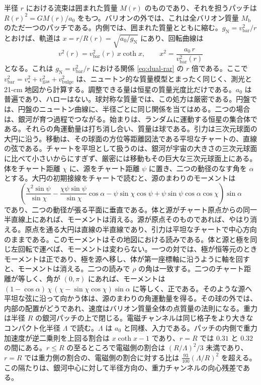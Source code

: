\documentclass[a4paper]{article}
\begin{document}
半径 $r$ における流束は囲まれた質量 $M(r)$ のものであり、それを担うパッチは $R(r)^2=GM(r)/a_0$ をもつ。バリオンの外では、これは全バリオン質量 $M_{\text{b}}$ のただ一つのパッチである。内側では、囲まれた質量とともに縮む。$g_{\text{N}}=v_{\text{bar}}^2/r$ とおけば、軌道は $x=r/R(r)=\sqrt{a_0/g_{\text{N}}}$ にあり、回転曲線は
\begin{equation}
\label{eq:dual-rotation}
v^2(r)=v_{\text{bar}}^2(r)\,x\coth x, \qquad x^2=\frac{a_0\,r}{v_{\text{bar}}^2(r)}
\end{equation}
となる。これは $g_{\text{N}}=v_{\text{bar}}^2/r$ における関係 \eqref{eq:dual-rar} の $r$ 倍である。ここで $v_{\text{bar}}^2=v_\star^2+v_{\text{gas}}^2+v_{\text{bulge}}^2$ は、ニュートン的な質量模型とまったく同じく、測光と 21-cm 地図から計算する。調整できる量は恒星の質量光度比だけである。$a_0$ は普遍であり、ハローはない。球対称な質量では、この処方は厳密である。円盤では、円盤のニュートン曲線に、半径ごとに同じ関係を当てはめる。二つの場合は、銀河が育つ過程でつながる。始まりは、ランダムに運動する恒星の集合体である。それらの角運動量は打ち消し合い、質量は球である。引力は三次元球面の大円に沿う。移動は、その球面の方位等距離図法である平坦なチャートの、直線の弦である。チャートを平坦として扱うのは、銀河が宇宙の大きさの三次元球面に比べて小さいからにすぎず、厳密には移動もその巨大な三次元球面上にある。体をチャート距離 $\chi$ に、源をチャート距離 $\psi$ に置き、二つの動径のなす角を $\alpha$ とする。大円の初期接線をチャートで読むと、源のまわりのモーメントは
\begin{equation}
\label{eq:sphere-chord}
\left(\frac{\chi^{2}\sin\psi}{\sin\chi}-\frac{\chi\psi\sin\psi}{\sin\chi}\cos\alpha-\psi\sin\chi\cos\psi+\psi\sin\psi\cos\alpha\cos\chi\right)\sin\alpha
\end{equation}
であり、二つの動径が張る平面に垂直である。体と源がチャート原点からの同一半直線上にあれば、モーメントは消える。源が原点そのものであれば、やはり消える。原点を通る大円は直線の半直線であり、引力は平坦なチャートで中心方向のままである。このモーメントはその地図における読みである。体と源と極を同じ左回転で運べば、モーメントは変わらない。一つの対では、極が恒等元のときモーメントは正であり、極を源へ移し、体が第一座標軸に沿うように軸を回すと、モーメントは消える。二つの読みで $\rho$ の角は一致する。二つのチャート距離が等しく、角が $(0,\pi)$ にあれば、モーメントは $(1-\cos\alpha)\,\chi\,(\chi-\sin\chi\cos\chi)\sin\alpha$ に等しく、正である。そのような源へ平坦な弦に沿って向かう体は、源のまわりの角運動量を得る。その球の外では、内部の配置がどうであれ、速度はバリオン質量全体の点質量の法則になる。重力は半径 \(R\) の銀河パッチの上で閉じる。電磁チャンネルは同じ格子をより大きなコンパクト化半径 \(\Lambda\) で読む。\(\Lambda\) は \(a_0\) と同様、入力である。パッチの内側で重力加速度が逆二乗則を上回る割合は \(x\coth x-1\) であり、\(r=R\) では \(0.31\) と \(0.32\) の間にある。\(r\le R\) の至るところで電磁側の割合は \((R/\Lambda)^2/3\) 未満であり、\(r=R\) では重力側の割合の、電磁側の割合に対する比は \(\frac{93}{100}(\Lambda/R)^2\) を超える。この隔たりは、銀河中心に対して半径方向の、重力チャンネルの向心残差である。
\end{document}
